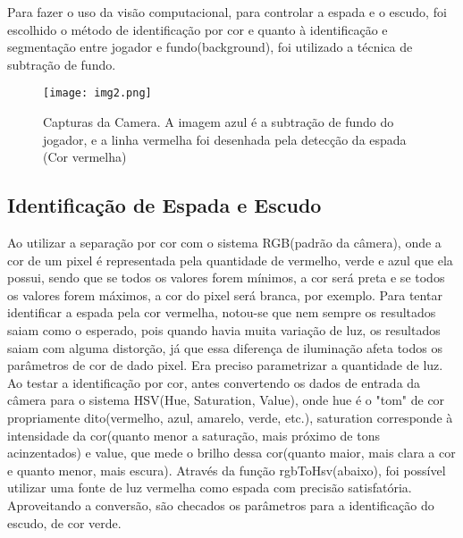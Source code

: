 \documentclass[12pt]{article}
\begin{document}
Para fazer o uso da visão computacional, para controlar a espada e o escudo, foi escolhido o método de identificação por cor e quanto à identificação e segmentação entre jogador e fundo(background), foi utilizado a técnica de subtração de fundo.

\begin{figure}[ht!]
\centering
\texttt{[image: img2.png]}
\caption{Capturas da Camera. A imagem azul é a subtração de fundo do jogador, e a linha vermelha foi desenhada pela detecção da espada (Cor vermelha)}
\label{fig:img2}
\end{figure}

\subsection{Identificação de Espada e Escudo}
Ao utilizar a separação por cor com o sistema RGB(padrão da câmera), onde a cor de um pixel é representada pela quantidade de vermelho, verde e azul que ela possui, sendo que se todos os valores forem mínimos, a cor será preta e se todos os valores forem máximos, a cor do pixel será branca, por exemplo. Para tentar identificar a espada pela cor vermelha, notou-se que nem sempre os resultados saiam como o esperado, pois quando havia muita variação de luz, os resultados saiam com alguma distorção, já que essa diferença de iluminação afeta todos os parâmetros de cor de dado pixel. Era preciso parametrizar a quantidade de luz. Ao testar a identificação por cor, antes convertendo os dados de entrada da câmera para o sistema HSV(Hue, Saturation, Value), onde hue é o "tom" de cor propriamente dito(vermelho, azul, amarelo, verde, etc.), saturation corresponde à intensidade da cor(quanto menor a saturação, mais próximo de tons acinzentados) e value, que mede o brilho dessa cor(quanto maior, mais clara a cor e quanto menor, mais escura). Através da função rgbToHsv(abaixo), foi possível utilizar uma fonte de luz vermelha como espada com precisão satisfatória. Aproveitando a conversão, são checados os parâmetros para a identificação do escudo, de cor verde.
\end{document}
